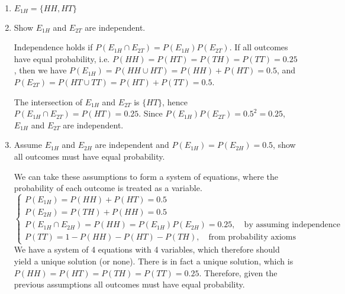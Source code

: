 \paragraph{}
\begin{enumerate}[label=\alph*.]
\item 

$E_{1H} = \{HH,HT\}$

\item Show $E_{1H}$ and $E_{2T}$ are independent.

Independence holds if $P(E_{1H} \cap E_{2T}) = P(E_{1H})P(E_{2T})$. If all outcomes have equal probability, i.e. $P(HH)=P(HT)=P(TH)=P(TT)=0.25$, then we have $P(E_{1H}) = P(HH \cup HT) = P(HH) + P(HT) = 0.5$, and $P(E_{2T}) = P(HT \cup TT) = P(HT) + P(TT) = 0.5$.

The intersection of $E_{1H}$ and $E_{2T}$ is $\{HT\}$, hence $P(E_{1H} \cap E_{2T}) = P(HT) = 0.25$. Since $P(E_{1H})P(E_{2T}) = 0.5^2=0.25$, $E_{1H}$ and $E_{2T}$ are independent.

\item Assume $E_{1H}$ and $E_{2H}$ are independent and $P(E_{1H}) = P(E_{2H}) = 0.5$, show all outcomes must have equal probability.

We can take these assumptions to form a system of equations, where the probability of each outcome is treated as a variable.
\begin{equation*}
\begin{cases}
        P(E_{1H}) = P(HH) + P(HT) = 0.5\\
        P(E_{2H}) = P(TH) + P(HH) = 0.5\\
		P(E_{1H}\cap E_{2H}) = P(HH) = P(E_{1H})P(E_{2H})=0.25,\quad \text{by assuming independence}\\
        P(TT) = 1 - P(HH) - P(HT) - P(TH), \quad\text{from probability axioms}
\end{cases}
\end{equation*}
We have a system of 4 equations with 4 variables, which therefore should yield a unique solution (or none). There is in fact a unique solution, which is $P(HH)=P(HT)=P(TH)=P(TT)=0.25$. Therefore, given the previous assumptions all outcomes must have equal probability.

\end{enumerate}


